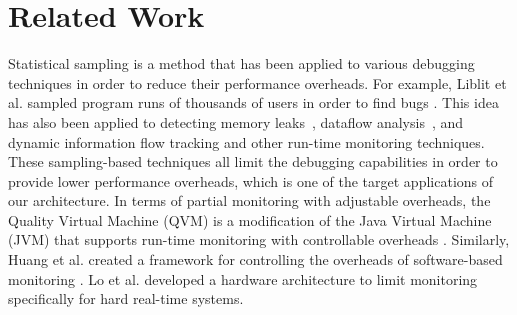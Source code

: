 \section{Related Work}
\label{sec:related}


 

Statistical sampling is a method that has been applied to various debugging
techniques in order to reduce their performance overheads. For example, Liblit
et al. sampled program runs of thousands of users in order to find bugs
\cite{liblit-pldi05}. This idea has also been applied to detecting memory
leaks~\cite{chilimbi-asplos04}, dataflow analysis~\cite{greathouse-cgo11}, and dynamic information flow tracking\cite{testudo-micro08} and
other run-time monitoring techniques. 
These sampling-based techniques all limit the debugging capabilities in order
to provide lower performance overheads, which is one of the target applications of our architecture.
In terms of partial monitoring with adjustable overheads, the Quality Virtual Machine (QVM) is a
modification of the Java Virtual Machine (JVM) that supports run-time
monitoring with controllable overheads \cite{qvm-oopsla08}. Similarly, Huang et
al. created a framework for controlling the overheads of software-based
monitoring \cite{huang-sttt12}. 
Lo et al. \cite{lo-rtas14} developed a hardware architecture to limit
monitoring specifically for hard real-time systems.

